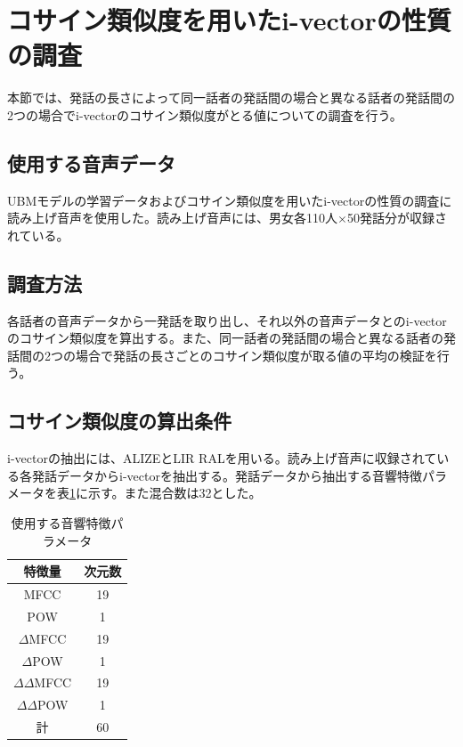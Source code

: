 \section{コサイン類似度を用いたi-vectorの性質の調査}
\label{section:pre_cos}
本節では、発話の長さによって同一話者の発話間の場合と異なる話者の発話間の2つの場合でi-vectorのコサイン類似度がとる値についての調査を行う。

\subsection{使用する音声データ}
\label{section:detail_ATR}
UBMモデルの学習データおよびコサイン類似度を用いたi-vectorの性質の調査に読み上げ音声\cite{ATR}を使用した。読み上げ音声には、男女各110人$×$50発話分が収録されている。

\subsection{調査方法}
各話者の音声データから一発話を取り出し、それ以外の音声データとのi-vectorのコサイン類似度を算出する。また、同一話者の発話間の場合と異なる話者の発話間の2つの場合で発話の長さごとのコサイン類似度が取る値の平均の検証を行う。\par

\subsection{コサイン類似度の算出条件}
i-vectorの抽出には、ALIZEとLIR RAL\cite{alize}を用いる。読み上げ音声に収録されている各発話データからi-vectorを抽出する。発話データから抽出する音響特徴パラメータを表\ref{iv_feature}に示す。また混合数は32とした。

\begin{table}[H]
  \begin{center}
    \caption{使用する音響特徴パラメータ}
    \label{iv_feature}
    \begin{tabular}{|c||c|} \hline
      特徴量 & 次元数\\ \hline
      MFCC & 19  \\ 
      POW & 1  \\ 
      $\Delta$MFCC & 19 \\ 
      $\Delta$POW & 1 \\ 
      $\Delta\Delta$MFCC & 19 \\ 
      $\Delta\Delta$POW & 1 \\ \hline
      計 & 60 \\ \hline
    \end{tabular}
  \end{center}
\end{table}

